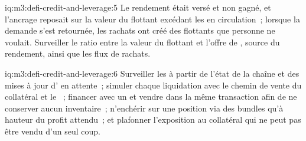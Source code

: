 \begin{solution}{iq:m3:defi-credit-and-leverage:5}
Le rendement était versé et non gagné, et l'ancrage reposait sur la valeur du  flottant excédant les  en circulation~; lorsque la demande s'est retournée, les rachats
ont créé des  flottants que personne ne voulait. Surveiller le ratio entre la valeur du  flottant et l'offre de , source du rendement, ainsi que les
flux de rachats.
\end{solution}

\begin{solution}{iq:m3:defi-credit-and-leverage:6}
Surveiller les  à partir de l'état de la chaîne et des mises à jour d' en attente~; simuler chaque liquidation avec le chemin de vente du collatéral et le ~; financer avec un
 et vendre dans la même transaction afin de ne conserver aucun inventaire~; n'enchérir sur une position via des bundles qu'à hauteur du profit attendu~; et plafonner l'exposition
au collatéral qui ne peut pas être vendu d'un seul coup.
\end{solution}
